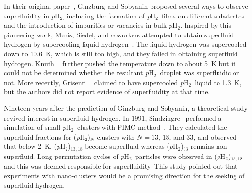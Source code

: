 \documentclass[12pt]{iopart}
\newcommand{\phtwo}{{\em p}H$_2$}
\begin{document}
In their original paper~\cite{ginzburg_pH2_superfluid}, Ginzburg and Sobyanin proposed several ways to observe superfluidity in \phtwo, including the  formation of \phtwo~films on different substrates and the introduction of impurities or vacancies in bulk \phtwo. 
Inspired by this pioneering work, Maris, Siedel, and coworkers attempted to obtain superfluid hydrogen by supercooling liquid hydrogen~\cite{maris_sf_h2_1,maris_sf_h2_2,maris_sf_h2_3}.
The liquid hydrogen was supercooled down to 10.6~K, which is still too high, and they failed in obtaining superfluid hydrogen. Knuth \etal~\cite{knuth_h2_supercool} further pushed the temperature down to about 5~K but it could not be determined whether the resultant \phtwo~droplet was superfluidic or not. More recently, Grisenti \etal~\cite{grisenti_supercool_h2} claimed to have supercooled \phtwo~liquid to 1.3~K, but the authors did not report evidence of superfluidity at that time.

Nineteen years after the prediction of Ginzburg and Sobyanin, a theoretical study revived interest in superfluid hydrogen. 
In 1991, Sindzingre \etal~performed a simulation of small \phtwo~clusters with PIMC method~\cite{sindzingre_pH2_superfluid}. 
They calculated the superfluid fractions for (\phtwo)$_N$ clusters with $N=13$, 18, and 33, and observed that below 2~K, (\phtwo)$_{13,18}$ become  superfluid whereas (\phtwo)$_{33}$ remains non-superfluid. 
Long permutation cycles of \phtwo~particles were observed in (\phtwo)$_{13,18}$ and this was deemed  responsible for superfluidity. This study pointed out that experiments with nano-clusters would be a promising direction for the seeking of superfluid hydrogen.
\end{document}
